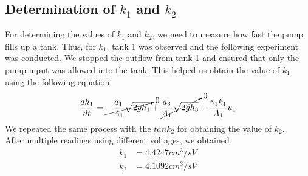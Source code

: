\documentclass[10pt,a4paper, twocolumn]{article}
\begin{document}
\subsection{Determination of $k_1$ and $k_2$}
For determining the values of $k_1$ and $k_2$, we need to measure how fast the pump fills up a tank. Thus, for $k_1$, tank 1 was observed and the following experiment was conducted.
We stopped the outflow from tank 1 and ensured that only the pump input was allowed into the tank. This helped us obtain the value of $k_1$ using the following equation:
\begin{equation*}
\dfrac{dh_1}{dt} = \cancelto{0}{-\dfrac{a_1}{A_1}\sqrt{2gh_1}} + \cancelto{0}{\dfrac{a_3}{A_1}\sqrt{2gh_3}} + \dfrac{\gamma_1 k_1}{A_1}u_1 
\end{equation*}
We repeated the same process with the $tank_2$ for obtaining the value of $k_2$. \\
After multiple readings using different voltages, we obtained 
\begin{align*}
k_1 &= 4.4247 cm^3 / sV \\
k_2 &= 4.1092 cm^3 / sV
\end{align*}
\end{document}
